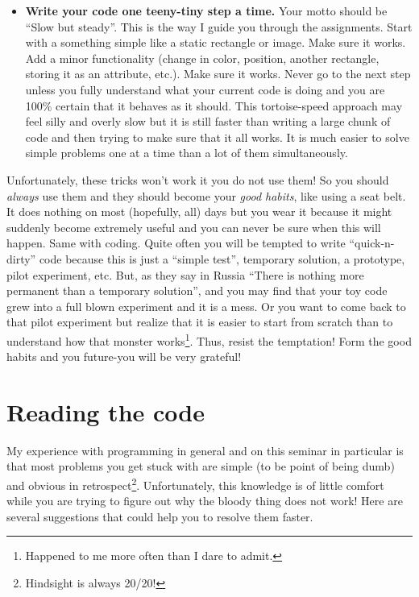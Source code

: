 \documentclass[
]{book}
\begin{document}
\begin{itemize}
\item
  \textbf{Write your code one teeny-tiny step a time.} Your motto should be ``Slow but steady''. This is the way I guide you through the assignments. Start with a something simple like a static rectangle or image. Make sure it works. Add a minor functionality (change in color, position, another rectangle, storing it as an attribute, etc.). Make sure it works. Never go to the next step unless you fully understand what your current code is doing and you are 100\% certain that it behaves as it should. This tortoise-speed approach may feel silly and overly slow but it is still faster than writing a large chunk of code and then trying to make sure that it all works. It is much easier to solve simple problems one at a time than a lot of them simultaneously.
\end{itemize}

Unfortunately, these tricks won't work it you do not use them! So you should \emph{always} use them and they should become your \emph{good habits}, like using a seat belt. It does nothing on most (hopefully, all) days but you wear it because it might suddenly become extremely useful and you can never be sure when this will happen. Same with coding. Quite often you will be tempted to write ``quick-n-dirty'' code because this is just a ``simple test'', temporary solution, a prototype, pilot experiment, etc. But, as they say in Russia ``There is nothing more permanent than a temporary solution'', and you may find that your toy code grew into a full blown experiment and it is a mess. Or you want to come back to that pilot experiment but realize that it is easier to start from scratch than to understand how that monster works\footnote{Happened to me more often than I dare to admit.}. Thus, resist the temptation! Form the good habits and you future-you will be very grateful!

\hypertarget{reading-the-code}{%
\section{Reading the code}\label{reading-the-code}}

My experience with programming in general and on this seminar in particular is that most problems you get stuck with are simple (to be point of being dumb) and obvious in retrospect\footnote{Hindsight is always 20/20!}. Unfortunately, this knowledge is of little comfort while you are trying to figure out why the bloody thing does not work! Here are several suggestions that could help you to resolve them faster.
\end{document}
